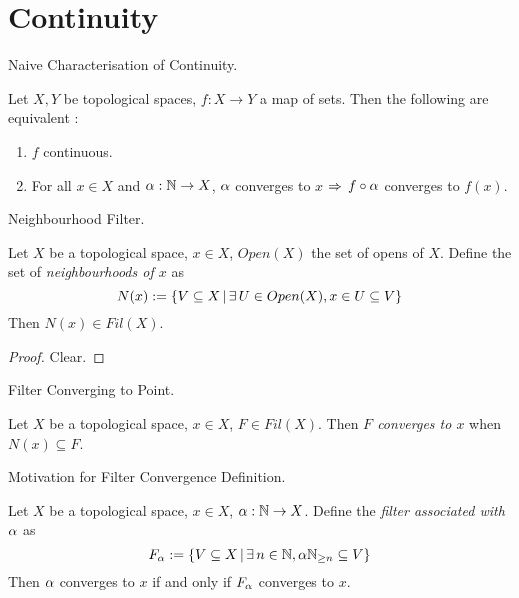 \documentclass[main.tex]{subfiles}
\begin{document}
\section{Continuity}

\begin{rmk} Naive Characterisation of Continuity. 
  
  Let $X, Y$ be topological spaces, $f : X \to Y$ a map of sets. 
  Then the following are equivalent : 
  \begin{enumerate}
    \item $f$ continuous. 
    \item For all $x \in X$ and $\alpha : \mathbb{N} \to X$,
    $\alpha$ converges to $x$ $\Rightarrow$
    $f \circ \alpha$ converges to $f(x)$.
  \end{enumerate}
\end{rmk}

\begin{prop} Neighbourhood Filter. 
  
  Let $X$ be a topological space, $x \in X$, 
  $Open(X)$ the set of opens of $X$. \newline
  Define the set of \emph{neighbourhoods of $x$} as 
  \[N(x) := 
  \left\{V \subseteq X \,|\, \exists\,U \in Open(X), x \in U \subseteq V\right\}\]
  Then $N(x) \in Fil(X)$. 
\end{prop}
\begin{proof} 
  Clear.
\end{proof}

\begin{dfn} Filter Converging to Point. 
  
  Let $X$ be a topological space, $x \in X$, $F \in Fil(X)$.
  Then \emph{$F$ converges to $x$} when $N(x) \subseteq F$.
\end{dfn}

\begin{rmk} Motivation for Filter Convergence Definition. 
  
  Let $X$ be a topological space, $x \in X$,
  $\alpha : \mathbb{N} \to X$. 
  Define the \emph{filter associated with $\alpha$} as 
  \[F_\alpha := 
  \{V \subseteq X \,|\, \exists\, n \in \mathbb{N}, \alpha\mathbb{N}_{\geq n} \subseteq V\}\]
  Then $\alpha$ converges to $x$ if and only if $F_\alpha$ converges to $x$.
\end{rmk}
\end{document}
